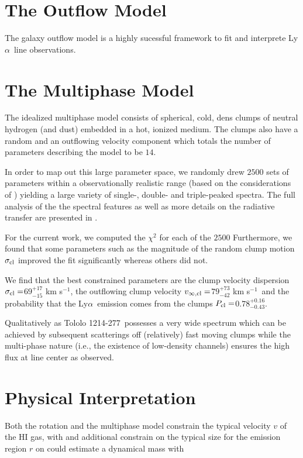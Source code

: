 \documentclass[a4paper, usenatbib, 12pt]{article}
\newcommand{\tol}{Tololo 1214-277}
\newcommand{\lya}{Ly$\alpha$}
\newcommand{\sigmaclump}{$69^{+17}_{-15}$ km s$^{-1}$}
\newcommand{\inftyclump}{$79^{+73}_{-42}$ km s$^{-1}$}
\newcommand{\probaclump}{$0.78^{+0.16}_{-0.43}$}
\begin{document}
{\section*{The Outflow Model}
The galaxy outflow model is a highly sucessful framework to fit
and interprete \lya\ line observations. 



\section*{The Multiphase Model} 

The idealized multiphase model consists of spherical, cold, dens
clumps of neutral hydrogen (and dust) embedded in a hot, ionized
medium. 
The clumps also have a random and an outflowing velocity
component which totals the number of parameters describing the model
to be $14$. 

In order to map out this large parameter space, we randomly drew
$2500$ sets of parameters within a observationally realistic range
(based on the considerations of \cite{Laursen2013ApJ...766..124L})
yielding a large variety of single-, double- and triple-peaked
spectra. 
The full analysis of the the spectral features as well as
more details on the radiative transfer are presented in
\cite{Gronke2016}.    
 
For the current work, we computed the $\chi^2$ for each of the $2500$
Furthermore, we found that some parameters such as the magnitude of
the random clump motion $\sigma_{\rm cl}$ improved the fit
significantly whereas others did not.  

We find that the best constrained parameters are the clump velocity
dispersion $\sigma_{\rm cl}=$\sigmaclump,  the outflowing clump
velocity $v_{\infty {\rm, cl}}=$\inftyclump\ and the probability that
the \lya\ emission comes from the clumps $P_{\rm cl}=$\probaclump.

Qualitatively as \tol\ possesses a very wide spectrum which can be
achieved by subsequent scatterings off (relatively) fast moving clumps
while the multi-phase nature (i.e., the existence of low-density
channels) ensures the high flux at line center as observed.     


\section*{Physical Interpretation}

Both the rotation and the multiphase model constrain the typical
velocity $v$ of the HI gas, with and additional constrain on the typical
size for the emission region $r$ on could estimate a dynamical mass with 

}
\end{document}
